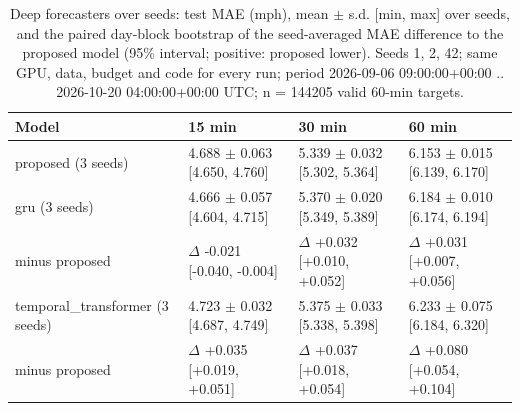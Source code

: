 \begin{table}[t]\centering\caption{Deep forecasters over seeds: test MAE (mph), mean $\pm$ s.d. [min, max] over seeds, and the paired day-block bootstrap of the seed-averaged MAE difference to the proposed model (95\% interval; positive: proposed lower). Seeds 1, 2, 42; same GPU, data, budget and code for every run; period 2026-09-06 09:00:00+00:00 .. 2026-10-20 04:00:00+00:00 UTC; n = 144205 valid 60-min targets.}\label{tab:multiseed}
\begin{tabular}{llll}\toprule
Model & 15 min & 30 min & 60 min \\ \midrule
proposed (3 seeds) & 4.688 $\pm$ 0.063 [4.650, 4.760] & 5.339 $\pm$ 0.032 [5.302, 5.364] & 6.153 $\pm$ 0.015 [6.139, 6.170] \\
gru (3 seeds) & 4.666 $\pm$ 0.057 [4.604, 4.715] & 5.370 $\pm$ 0.020 [5.349, 5.389] & 6.184 $\pm$ 0.010 [6.174, 6.194] \\
\quad minus proposed & $\Delta$ -0.021 [-0.040, -0.004] & $\Delta$ +0.032 [+0.010, +0.052] & $\Delta$ +0.031 [+0.007, +0.056] \\
temporal\_transformer (3 seeds) & 4.723 $\pm$ 0.032 [4.687, 4.749] & 5.375 $\pm$ 0.033 [5.338, 5.398] & 6.233 $\pm$ 0.075 [6.184, 6.320] \\
\quad minus proposed & $\Delta$ +0.035 [+0.019, +0.051] & $\Delta$ +0.037 [+0.018, +0.054] & $\Delta$ +0.080 [+0.054, +0.104] \\
\bottomrule\end{tabular}\end{table}
